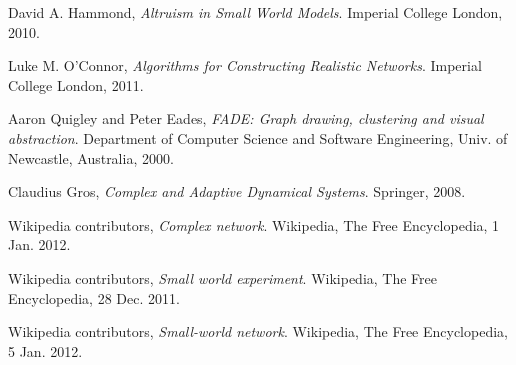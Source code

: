 \documentclass[a4paper,11pt,titlepage]{article}
\begin{document}
\begin{thebibliography}{9}

  David A. Hammond,
  \emph{Altruism in Small World Models}.
  Imperial College London,
  2010.

  Luke M. O'Connor,
  \emph{Algorithms for Constructing Realistic Networks}.
  Imperial College London,
  2011.

  Aaron Quigley and Peter Eades,
  \emph{FADE: Graph drawing, clustering and visual abstraction}.
  Department of Computer Science and Software Engineering,
  Univ. of  Newcastle, Australia, 2000.

  Claudius Gros,
  \emph{Complex and Adaptive Dynamical Systems}.
  Springer,
  2008.

  Wikipedia contributors,
  \emph{Complex network}.
  Wikipedia, The Free Encyclopedia, 1 Jan. 2012.

  Wikipedia contributors,
  \emph{Small world experiment}.
  Wikipedia, The Free Encyclopedia, 28 Dec. 2011.

  Wikipedia contributors,
  \emph{Small-world network}.
  Wikipedia, The Free Encyclopedia, 5 Jan. 2012.

\end{thebibliography}
\end{document}
